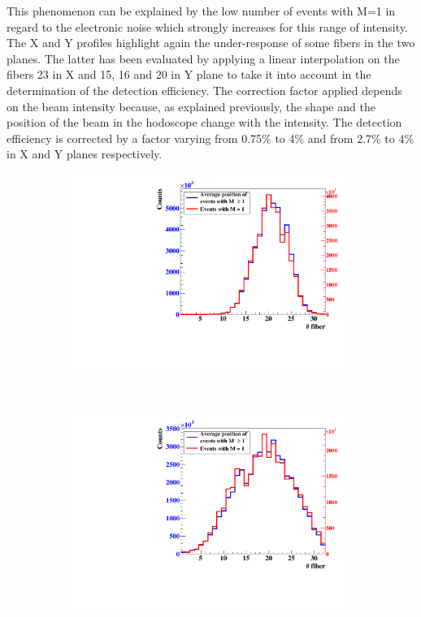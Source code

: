 \documentclass[a4paper,11pt]{article}
\begin{document}
This phenomenon can be explained by the low number of events with M=1 in regard to the electronic noise which strongly increases for this range of intensity. The X and Y profiles highlight again the under-response of some fibers in the two planes. The latter has been evaluated by applying a linear interpolation on the fibers 23 in X and 15, 16 and 20 in Y plane to take it into account in the determination of the detection efficiency. The correction factor applied depends on the beam intensity because, as explained previously, the shape and the position of the beam in the hodoscope change with the intensity. The detection efficiency is corrected by a factor varying from 0.75\% to 4\% and from 2.7\% to 4\% in X and Y planes respectively.

\begin{figure}[H]
\centering
    \begin{subfigure}{0.47\textwidth} \centering \includegraphics[width=\textwidth]{figures/Plane_X_1MHz.pdf} \caption{} \label{fig:Plane_X_1MHz}
    \end{subfigure}
    ~
    \begin{subfigure}{0.47\textwidth} \centering \includegraphics[width=\textwidth]{figures/Plane_Y_1MHz.pdf} \caption{} \label{fig:Plane_Y_1MHz}

\end{subfigure}
\end{figure}
\end{document}
